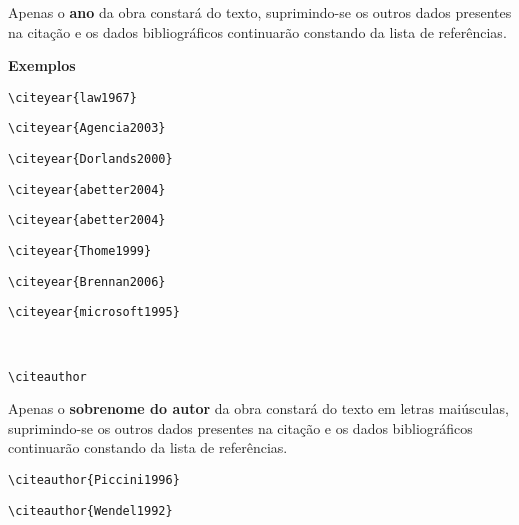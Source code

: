 \begin{alineas}
Apenas o \textbf{ano} da obra constará do texto, suprimindo-se os outros dados presentes na citação e os dados bibliográficos continuarão constando da lista de referências. 

\textbf{Exemplos}

\begin{verbatim}
\citeyear{law1967}
\end{verbatim}
\citeyear{law1967}

\begin{verbatim}
\citeyear{Agencia2003}
\end{verbatim}
\citeyear{Agencia2003}

\begin{verbatim}
\citeyear{Dorlands2000}
\end{verbatim}
\citeyear{Dorlands2000}

\begin{verbatim}
\citeyear{abetter2004}
\end{verbatim}
\citeyear{abetter2004}

\begin{verbatim}
\citeyear{abetter2004}
\end{verbatim}
\citeyear{council2001}

\begin{verbatim}
\citeyear{Thome1999}
\end{verbatim}
\citeyear{Thome1999}


\begin{verbatim}
\citeyear{Brennan2006}
\end{verbatim}
\citeyear{Brennan2006}

\begin{verbatim}
\citeyear{microsoft1995}
\end{verbatim}
\citeyear{microsoft1995}\\

\item
\begin{verbatim}
\citeauthor
\end{verbatim}

Apenas o \textbf{sobrenome do autor} da obra constará do texto em letras maiúsculas, suprimindo-se os outros dados presentes na citação e os dados bibliográficos continuarão constando da lista de referências. 

{\tiny {\tiny }}\begin{verbatim}
\citeauthor{Piccini1996} 
\end{verbatim}
\citeauthor{Piccini1996} 

\begin{verbatim}
\citeauthor{Wendel1992}
\end{verbatim}
\citeauthor{Wendel1992}


\end{alineas}
